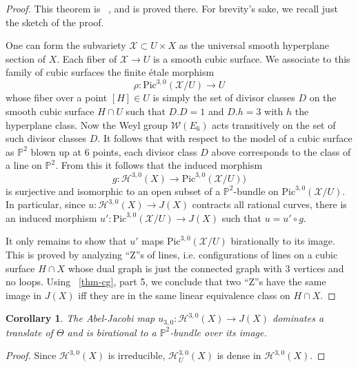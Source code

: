 \documentclass[amssymb,twoside,12 pt,amscd,reqno]{amsart}
\theoremstyle{plain}
\newtheorem{cor}[thm]{Corollary}
\theoremstyle{definition}
\newcommand{\Hdg}[2]{\mathcal{H}^{#1,#2}}
\newcommand{\PP}{\mathbb{P}}
\def\ps{\vspace{4pt}}
\begin{document}
\begin{proof}
This theorem is  ~\cite[theorem 4.5]{HRS1}, and is proved there.  For
brevity's sake, we recall just the sketch of the proof.

\ps

One can form the subvariety $\mathcal{X}\subset U\times X$ as the
universal smooth hyperplane section of $X$.  Each fiber of
$\mathcal{X}\rightarrow U$ is a smooth cubic surface.  We associate to
this family of cubic surfaces the finite \'etale morphism
\begin{equation}
\rho: \text{Pic}^{3,0}(\mathcal{X}/U) \rightarrow U
\end{equation}
whose fiber over a point $[H]\in U$ is simply the set of divisor
classes $D$ on the smooth cubic surface $H\cap U$ such that $D.D =1$
and $D.h=3$
with $h$ the hyperplane class.  Now the Weyl group $\mathcal{W}(E_6)$
acts transitively on the set of such divisor classes $D$. It follows
that with respect to the model of a cubic surface as 
$\PP^2$ blown up at 6 points, each divisor class $D$ above corresponds
to the class of a line on $\PP^2$.  From this it follows that the
induced morphism 
\begin{equation}
g:\Hdg{3}{0}(X)\rightarrow \text{Pic}^{3,0}(\mathcal{X}/U))
\end{equation}
is surjective and isomorphic to an open subset of a $\PP^2$-bundle on
$\text{Pic}^{3,0}(\mathcal{X}/U)$.  In particular, since
$u:\Hdg{3}{0}(X)\rightarrow J(X)$ contracts all rational curves, there
is an induced morphism $u':\text{Pic}^{3,0}(\mathcal{X}/U)\rightarrow
J(X)$ such that $u=u'\circ g$.  

\ps

It only remains to show that $u'$ maps
$\text{Pic}^{3,0}(\mathcal{X}/U)$ birationally to its image.  This is
proved by analyzing ``Z''s of lines, i.e. configurations of lines on a
cubic surface $H\cap X$ whose dual graph is just the connected graph with 3
vertices and no loops.  Using ~\ref{thm-cg}, part 5, we conclude
that two ``Z''s have the same image in $J(X)$ iff they are in the same
linear equivalence class on $H\cap X$.  
\end{proof}

\begin{cor}\label{cor-aj30}  The Abel-Jacobi map
$u_{3,0}:\Hdg{3}{0}(X)\rightarrow J(X)$ dominates a translate of
$\Theta$ and is birational to a $\PP^2$-bundle over its image.
\end{cor}

\begin{proof}  Since $\Hdg{3}{0}(X)$ is irreducible, $\Hdg{3}{0}_U(X)$ 
is dense in $\Hdg{3}{0}(X)$.
\end{proof}
\end{document}
